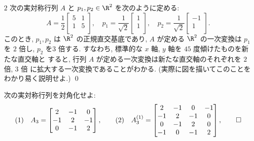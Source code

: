 \documentclass[12pt,twoside]{jarticle}
\begin{document}
\begin{question}
  $2$ 次の実対称行列 $A$ と $p_1,p_2\in\R^2$ を次のように定める:
  \begin{equation*}
    A = 
    \frac{1}{2}
    \begin{bmatrix}
      5 & 1 \\
      1 & 5 \\
    \end{bmatrix},
    \quad
    p_1 =
    \frac{1}{\sqrt{2}}
    \begin{bmatrix}
      1 \\
      1 \\
    \end{bmatrix}, 
    \quad
    p_2 =
    \frac{1}{\sqrt{2}}
    \begin{bmatrix}
      -1 \\
      1 \\
    \end{bmatrix}.
  \end{equation*}
  このとき, $p_1,p_2$ は $\R^2$ の正規直交基底であり, 
  $A$ が定める $\R^2$ の一次変換は $p_1$ を $2$ 倍し, $p_2$ を$3$ 倍する.
  すなわち, 標準的な $x$ 軸, $y$ 軸を $45$ 度傾けたものを新たな直交軸と
  すると, 行列 $A$ が定める一次変換は新たな直交軸のそれぞれを $2$ 倍, $3$ 倍
  に拡大する一次変換であることがわかる.
  (実際に図を描いてこのことをわかり易く説明せよ.)
  \qed
\end{question}


\begin{question}
\label{q:Cartan(A3)}
  次の実対称行列を対角化せよ:
  \begin{equation*}
    (1)\quad A_3 = 
    \begin{bmatrix}
       2 & -1 &  0 \\
      -1 &  2 & -1 \\
       0 & -1 &  2 \\
    \end{bmatrix},
    \qquad
    (2)\quad A_3^{(1)} = 
    \begin{bmatrix}
       2 & -1 &  0 & -1 \\
      -1 &  2 & -1 &  0 \\
       0 & -1 &  2 &  0 \\
      -1 &  0 & -1 &  2 \\
    \end{bmatrix},
    \qed
  \end{equation*}
\end{question}
\end{document}

